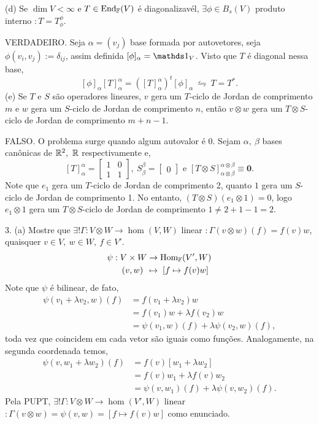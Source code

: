 (d) Se \(\dim V < \infty\) e \( T\in \ehom(V)\) é diagonalizavél, \(\exists \phi \in B_s(V)\) produto interno \(: T= T^\phi_\phi\). 

\textcolor{gris}{VERDADEIRO. Seja \(\alpha = (v_j)\) base formada por autovetores, seja \(\phi(v_i,v_j) := \delta_{ij}\), assim definida \([\phi]_\alpha = \id_V\). Visto que \(T\) é diagonal nessa base, 
\[[\phi]_\alpha [T]_\alpha^\alpha = ([T]_\alpha^\alpha)^t [\phi]_\alpha \ \leftrightharpoons \ T = T^*.\] 
}
(e) Se \(T\) e \(S\) são operadores lineares, \(v \) gera um \(T\)-ciclo de Jordan de comprimento \(m\) e \(w\) gera um \(S\)-ciclo de Jordan de comprimento \(n\), então \(v\otimes w\) gera um \(T\otimes S\)-ciclo de Jordan de comprimento \(m+n-1\). 

\textcolor{gris}{FALSO. O problema surge quando algum autovalor é 0. Sejam \(\alpha, \ \beta \) bases canônicas de \(\R^2, \ \R\) respectivamente e, 
\[[T]_\alpha^\alpha = \begin{bmatrix}
  1 & 0 \\ 
  1 & 1
\end{bmatrix}, \  S_\beta^\beta = \begin{bmatrix}
  0
\end{bmatrix} \text{ \ \ e \ \ } [T\otimes S]^{\alpha\otimes \beta}_{\alpha\otimes \beta}\equiv \textbf{0}.\]
Note que \(e_1\) gera um \(T\)-ciclo de Jordan de comprimento 2, quanto \(1\) gera um \(S\)-ciclo de Jordan de comprimento 1. No entanto, \((T\otimes S)(e_1 \otimes 1) = 0\), logo \(e_1 \otimes 1\) gera um \(T\otimes S\)-ciclo de Jordan de comprimento \(1 \neq 2 + 1 -1 =2\).  
}

3. (a) Mostre que \(\exists !\Gamma : V\otimes W \to \hom(V,W)\) linear \(:\Gamma(v\otimes w)(f) = f(v) w \), quaisquer \( v\in V, \ w \in W, \ f \in V'\). 
\textcolor{gris}{
  \begin{align*}
    \psi :  V \times W &\to \hom(V', W) \\ 
(v,w) \hspace{0.15cm}&\mapsto \hspace{0.1cm}[f \mapsto f(v) w ]
  \end{align*}
  Note que \(\psi\) é bilinear, de fato, 
  \begin{align*}
    \psi(v_1+\lambda v_2, w)(f) &= f(v_1 + \lambda v_2) w \\ 
    &= f(v_1)w + \lambda f(v_2) w \\ 
    &= \psi(v_1,w)(f)+ \lambda \psi(v_2, w )(f), 
  \end{align*}
  toda vez que coincidem em cada vetor são iguais como funções. Analogamente, na segunda coordenada temos,  
  \begin{align*}
    \psi(v, w_1+\lambda w_2)(f) &= f(v) [w_1 + \lambda w_2] \\ 
    &= f(v)w_1 + \lambda f(v) w_2 \\ 
    &= \psi(v,w_1)(f)+ \lambda \psi(v, w_2)(f). 
  \end{align*}
  Pela PUPT, \(\exists ! \Gamma : V\otimes W \to \hom(V',W) \) linear \(:  \Gamma (v \otimes w) =\psi(v,w) = [f \mapsto f(v)w]\) como enunciado. 
}

